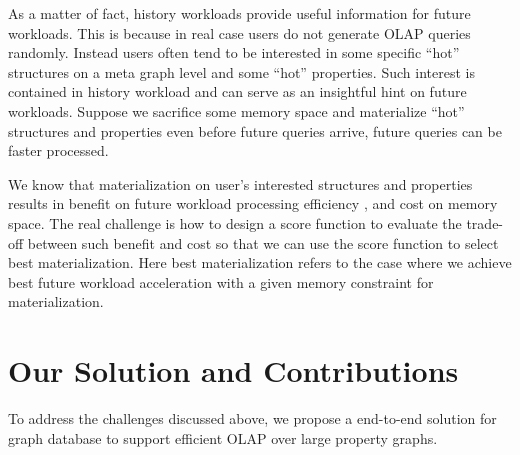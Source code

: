 As a matter of fact, history workloads provide useful information for future workloads. This is because in real case users do not generate OLAP queries randomly. Instead users often tend to be interested in some specific ``hot'' structures on a meta graph level and some ``hot'' properties. Such interest is contained in history workload and can serve as an insightful hint on future workloads. Suppose we sacrifice some memory space and materialize ``hot'' structures and properties even before future queries arrive, future queries can be faster processed.  


We know that materialization on user's interested structures and properties results in benefit on future workload processing efficiency , and cost on memory space. The real challenge is how to design a score function to evaluate the trade-off  between such benefit and cost so that we can use the score function to select best materialization. Here best materialization refers to the case where we achieve best future workload acceleration with a given memory constraint for materialization.

	
	


\section{Our Solution and Contributions}
To address the challenges discussed above, we propose a end-to-end solution for graph database to  support efficient  OLAP over large property graphs.

